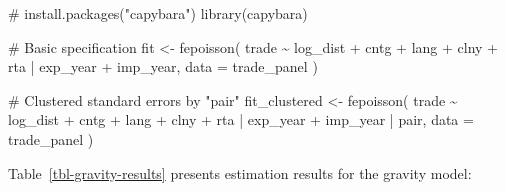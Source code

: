 \documentclass[
  10pt,
  letterpaper,
]{article}
\newenvironment{Shaded}{\begin{snugshade}}{\end{snugshade}}
\newcommand{\AttributeTok}[1]{\textcolor[rgb]{0.40,0.45,0.13}{#1}}
\newcommand{\CommentTok}[1]{\textcolor[rgb]{0.37,0.37,0.37}{#1}}
\newcommand{\FunctionTok}[1]{\textcolor[rgb]{0.28,0.35,0.67}{#1}}
\newcommand{\NormalTok}[1]{\textcolor[rgb]{0.00,0.23,0.31}{#1}}
\newcommand{\OtherTok}[1]{\textcolor[rgb]{0.00,0.23,0.31}{#1}}
\newcommand{\SpecialCharTok}[1]{\textcolor[rgb]{0.37,0.37,0.37}{#1}}
\begin{document}
\begin{Shaded}
\begin{Highlighting}[]
\CommentTok{\# install.packages("capybara")}
\FunctionTok{library}\NormalTok{(capybara)}

\CommentTok{\# Basic specification}
\NormalTok{fit }\OtherTok{\textless{}{-}} \FunctionTok{fepoisson}\NormalTok{(}
\NormalTok{  trade }\SpecialCharTok{\textasciitilde{}}\NormalTok{ log\_dist }\SpecialCharTok{+}\NormalTok{ cntg }\SpecialCharTok{+}\NormalTok{ lang }\SpecialCharTok{+}\NormalTok{ clny }\SpecialCharTok{+}\NormalTok{ rta }\SpecialCharTok{|}\NormalTok{ exp\_year }\SpecialCharTok{+}\NormalTok{ imp\_year,}
  \AttributeTok{data =}\NormalTok{ trade\_panel}
\NormalTok{)}

\CommentTok{\# Clustered standard errors by "pair"}
\NormalTok{fit\_clustered }\OtherTok{\textless{}{-}} \FunctionTok{fepoisson}\NormalTok{(}
\NormalTok{  trade }\SpecialCharTok{\textasciitilde{}}\NormalTok{ log\_dist }\SpecialCharTok{+}\NormalTok{ cntg }\SpecialCharTok{+}\NormalTok{ lang }\SpecialCharTok{+}\NormalTok{ clny }\SpecialCharTok{+}\NormalTok{ rta }\SpecialCharTok{|} 
\NormalTok{    exp\_year }\SpecialCharTok{+}\NormalTok{ imp\_year }\SpecialCharTok{|}\NormalTok{ pair,}
  \AttributeTok{data =}\NormalTok{ trade\_panel}
\NormalTok{)}
\end{Highlighting}
\end{Shaded}

Table~\ref{tbl-gravity-results} presents estimation results for the
gravity model:

\begin{table}

\caption{\label{tbl-gravity-results}Estimation results for the PPML gravity model. Source: own creation.}


\end{table}%
\end{document}

